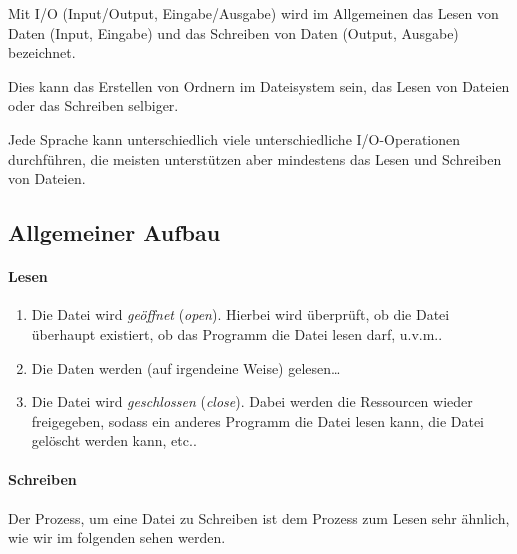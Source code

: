 
Mit I/O (Input/Output, Eingabe/Ausgabe) wird im Allgemeinen das Lesen von Daten (Input, Eingabe) und das Schreiben von Daten (Output, Ausgabe) bezeichnet.

Dies kann das Erstellen von Ordnern im Dateisystem sein, das Lesen von Dateien oder das Schreiben selbiger.

Jede Sprache kann unterschiedlich viele unterschiedliche I/O-Operationen durchführen, die meisten unterstützen aber mindestens das Lesen und Schreiben von Dateien.

\subsection{Allgemeiner Aufbau}
	
	\paragraph{Lesen}
		\begin{enumerate}
			\item Die Datei wird \textit{geöffnet} (\textit{open}). Hierbei wird überprüft, ob die Datei überhaupt existiert, ob das Programm die Datei lesen darf, u.v.m..
			\item Die Daten werden (auf irgendeine Weise) gelesen\dots
			\item Die Datei wird \textit{geschlossen} (\textit{close}). Dabei werden die Ressourcen wieder freigegeben, sodass ein anderes Programm die Datei lesen kann, die Datei gelöscht werden kann, etc..
		\end{enumerate}
		
	
	\paragraph{Schreiben}
		Der Prozess, um eine Datei zu Schreiben ist dem Prozess zum Lesen sehr ähnlich, wie wir im folgenden sehen werden.
	
